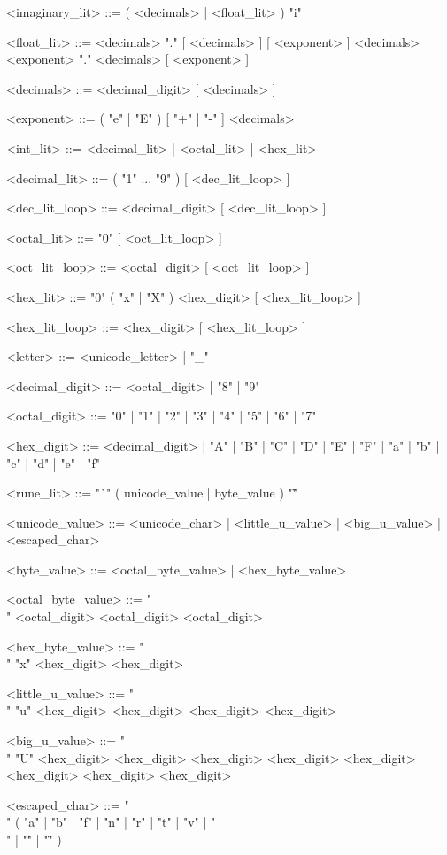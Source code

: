 \documentclass{article}
\begin{document}
\begin{grammar}
        <imaginary_lit>     ::=     ( <decimals> | <float_lit> ) "i"

        <float_lit>         ::=     <decimals> "." [ <decimals> ] [ <exponent> ]
                            \alt    <decimals> <exponent>
                            \alt    "." <decimals> [ <exponent> ]
        
        <decimals>          ::=     <decimal_digit> [ <decimals> ]

        <exponent>          ::=     ( "e" | "E" ) [ "+" | "-" ] <decimals>

        <int_lit>           ::=     <decimal_lit> | <octal_lit> | <hex_lit>

        <decimal_lit>       ::=     ( "1" ... "9" ) [ <dec_lit_loop> ]

        <dec_lit_loop>      ::=     <decimal_digit> [ <dec_lit_loop> ]

        <octal_lit>         ::=     "0" [ <oct_lit_loop> ]
        
        <oct_lit_loop>      ::=     <octal_digit> [ <oct_lit_loop> ]

        <hex_lit>           ::=     "0" ( "x" | "X" ) <hex_digit> [ <hex_lit_loop> ]

        <hex_lit_loop>      ::=     <hex_digit> [ <hex_lit_loop> ]

        <letter>            ::=     <unicode_letter> | "_"

        <decimal_digit>     ::=     <octal_digit> | "8" | "9"

        <octal_digit>       ::=     "0" | "1" | "2" | "3" | "4" | "5" | "6" | "7"

        <hex_digit>         ::=     <decimal_digit> | "A" | "B" | "C" | "D" | "E" | "F" | "a" | "b" | "c" | "d" | "e" | "f"

        <rune_lit>          ::=     "`" ( unicode_value | byte_value ) "\""

        <unicode_value>     ::=     <unicode_char> | <little_u_value> | <big_u_value> | <escaped_char>

        <byte_value>        ::=     <octal_byte_value> | <hex_byte_value>

        <octal_byte_value>  ::=     "\\" <octal_digit> <octal_digit> <octal_digit>

        <hex_byte_value>    ::=     "\\" "x" <hex_digit> <hex_digit>

        <little_u_value>    ::=     "\\" "u" <hex_digit> <hex_digit> <hex_digit> <hex_digit>

        <big_u_value>       ::=     "\\" "U" <hex_digit> <hex_digit> <hex_digit> <hex_digit> <hex_digit> <hex_digit> <hex_digit> <hex_digit>

        <escaped_char>      ::=     "\\" ( "a" | "b" | "f" | "n" | "r" | "t" | "v" | "\\" | "\'" | "\"" )

    \end{grammar}
\end{document}
